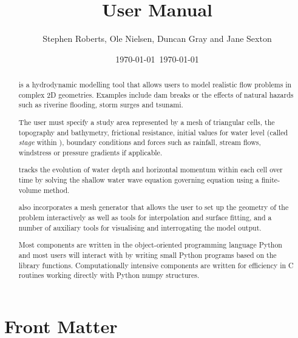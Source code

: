 \documentclass{manual}
\title{\anuga User Manual}
\author{Stephen Roberts, Ole Nielsen, Duncan Gray and Jane Sexton}
\date{\today \ \currenttime}
\date{\today} %
\begin{document}
\maketitle

\ifhtml
  \chapter*{Front Matter\label{front}}
\fi

%



\begin{abstract}
\label{def:anuga}

\noindent \anuga\index{\anuga} is a hydrodynamic modelling tool that
allows users to model realistic flow problems in complex 2D geometries.
Examples include dam breaks or the effects of natural hazards such
as riverine flooding, storm surges and tsunami.

The user must specify a study area represented by a mesh of triangular
cells, the topography and bathymetry, frictional resistance, initial
values for water level (called \emph{stage} within \anuga),
boundary conditions and forces such as rainfall, stream flows, windstress or pressure gradients if applicable.

\anuga tracks the evolution of water depth and horizontal momentum
within each cell over time by solving the shallow water wave equation
governing equation using a finite-volume method.

\anuga also incorporates a mesh generator that
allows the user to set up the geometry of the problem interactively as
well as tools for interpolation and surface fitting, and a number of
auxiliary tools for visualising and interrogating the model output.

Most \anuga components are written in the object-oriented programming
language Python and most users will interact with \anuga by writing
small Python programs based on the \anuga library
functions. Computationally intensive components are written for
efficiency in C routines working directly with Python numpy structures.

\end{abstract}

\tableofcontents
\end{document}

